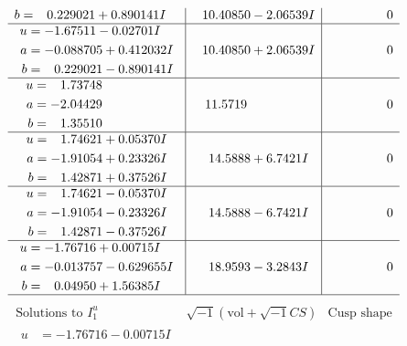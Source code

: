 \documentclass[1p]{elsarticle_modified}
\theoremstyle{definition}
\newcommand{\I}{\sqrt{-1}}
\begin{document}
$$\begin{array}{c|c|c}
\begin{aligned}
b &= \phantom{-}0.229021 + 0.890141 I\end{aligned}
 & \phantom{-}10.40850 - 2.06539 I & \phantom{-0.000000 } 0 \\ \hline\begin{aligned}
u &= -1.67511 - 0.02701 I \\
a &= -0.088705 + 0.412032 I \\
b &= \phantom{-}0.229021 - 0.890141 I\end{aligned}
 & \phantom{-}10.40850 + 2.06539 I & \phantom{-0.000000 } 0 \\ \hline\begin{aligned}
u &= \phantom{-}1.73748\phantom{ +0.000000I} \\
a &= -2.04429\phantom{ +0.000000I} \\
b &= \phantom{-}1.35510\phantom{ +0.000000I}\end{aligned}
 & \phantom{-}11.5719\phantom{ +0.000000I} & \phantom{-0.000000 } 0 \\ \hline\begin{aligned}
u &= \phantom{-}1.74621 + 0.05370 I \\
a &= -1.91054 + 0.23326 I \\
b &= \phantom{-}1.42871 + 0.37526 I\end{aligned}
 & \phantom{-}14.5888 + 6.7421 I & \phantom{-0.000000 } 0 \\ \hline\begin{aligned}
u &= \phantom{-}1.74621 - 0.05370 I \\
a &= -1.91054 - 0.23326 I \\
b &= \phantom{-}1.42871 - 0.37526 I\end{aligned}
 & \phantom{-}14.5888 - 6.7421 I & \phantom{-0.000000 } 0 \\ \hline\begin{aligned}
u &= -1.76716 + 0.00715 I \\
a &= -0.013757 - 0.629655 I \\
b &= \phantom{-}0.04950 + 1.56385 I\end{aligned}
 & \phantom{-}18.9593 - 3.2843 I & \phantom{-0.000000 } 0\\
 \hline 
 \end{array}$$\newpage$$\begin{array}{c|c|c}  
\text{Solutions to }I^u_{1}& \I (\text{vol} + \sqrt{-1}CS) & \text{Cusp shape}\\
 \hline 
\begin{aligned}
u &= -1.76716 - 0.00715 I \\

\end{aligned}
\end{array}$$
\end{document}
